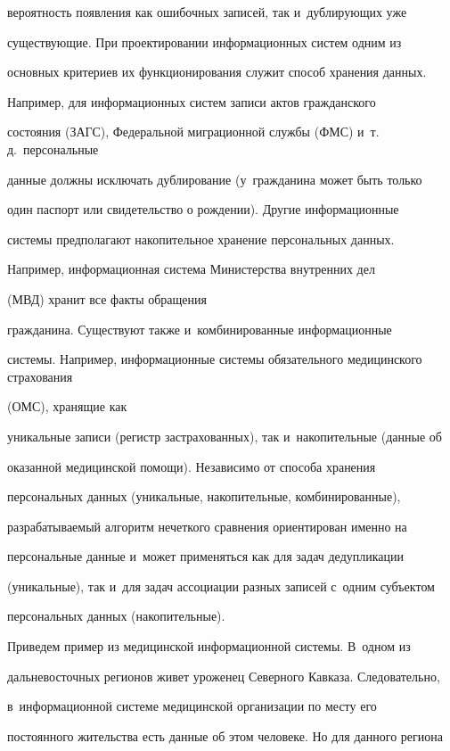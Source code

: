 вероятность появления как ошибочных записей, так и~дублирующих уже 


существующие. При проектировании информационных систем одним из 


основных критериев их функционирования служит способ хранения данных. 


Например, для информационных систем записи актов гражданского


состояния (ЗАГС), Федеральной миграционной службы (ФМС) и~т.\,д.\ персональные 


данные должны исключать дублирование (у~гражданина может быть только 


один паспорт или свидетельство о рождении). Другие информационные 


системы предполагают накопительное хранение персональных данных. 


Например, информационная система Министерства внутренних дел


(МВД) хранит все факты обращения 


гражданина. Существуют также и~комбинированные информационные 


системы. Например, информационные системы обязательного медицинского страхования


(ОМС), хранящие как 


уникальные записи (регистр застрахованных), так и~накопительные (данные об 


оказанной медицинской помощи). Независимо от способа хранения 


персональных данных (уникальные, накопительные, комбинированные), 


разрабатываемый алгоритм нечеткого сравнения ориентирован именно на 


персональные данные и~может применяться как для задач дедупликации 


(уникальные), так и~для задач ассоциации разных записей с~одним субъектом 


персональных данных (накопительные).


  


  Приведем пример из медицинской информационной системы. В~одном из 


дальневосточных регионов живет уроженец Северного Кавказа. Следовательно, 


в~информационной системе медицинской организации по месту его 


постоянного жительства есть данные об этом человеке. Но для данного региона 


